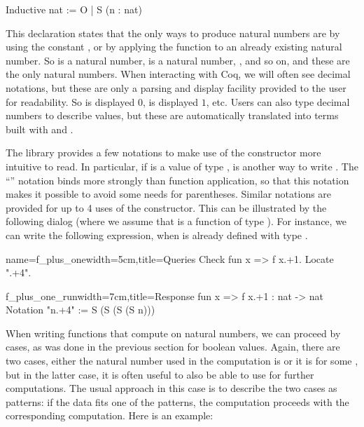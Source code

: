 \begin{coq}{}{}
Inductive nat := O | S (n : nat)
\end{coq}

This declaration states that the only ways to produce natural numbers
are by using the constant , or by applying the function  to
an already existing natural number.  So  is a natural number,
 is a
natural number, , and so on, and these are the only natural
numbers.  When interacting with Coq, we will often see decimal
notations, but these are only a parsing and display
facility provided to the user for readability.  So  is displayed
$0$,  is displayed $1$, etc.  Users can also type decimal
numbers to describe values, but these are automatically translated into
terms built with  and .

The \mcbMC{} library provides a few notations to make use of the
constructor  more intuitive to read.  In particular, if 
is a value of type ,  is another way to write .  The ``'' notation binds more strongly than function
application, so that this notation makes it possible to avoid some
needs for parentheses.
Similar notations are provided for up to 4 uses of the 
constructor.  This can be illustrated by the following dialog (where
we assume that  is a function of type ).
  For instance, we can write the following
expression, when  is already defined with type .

\begin{coq}{name=f_plus_one}{width=5cm,title=Queries}
Check fun x => f x.+1.
Locate ".+4".
\end{coq}
\begin{coqout}{f_plus_one_run}{width=7cm,title=Response}
fun x => f x.+1 : nat -> nat
Notation "n.+4" := S (S (S (S n)))
\end{coqout}

When writing functions that compute on natural numbers, we can
proceed by cases, as was done in the previous section for boolean
values.  Again, there are two cases, either the natural number used in
the computation is  or it is  for
some , but in the latter case, it is often useful to also be able
to use  for further computations.  The usual approach in this
case is to describe the two cases as patterns: if the data fits one of
the patterns, the computation proceeds with the corresponding
computation.  Here is an example:

